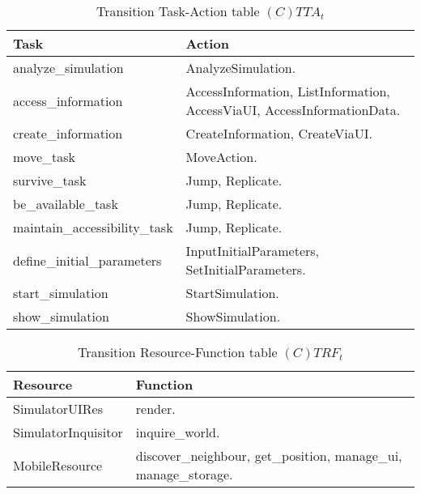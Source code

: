 \begin{table}[H]
	\centering
	\begin{tabular}{|p{4cm}|p{8cm}|}
			\hline
			\textbf{Task} & \textbf{Action} \\
			\hline
			analyze\_simulation & AnalyzeSimulation. \\
			\hline
			access\_information & AccessInformation, ListInformation, AccessViaUI,
			AccessInformationData.\\
			\hline
			create\_information & CreateInformation, CreateViaUI. \\
			\hline
			move\_task & MoveAction. \\
			\hline
			survive\_task & Jump, Replicate. \\
			\hline
			be\_available\_task & Jump, Replicate. \\
			\hline
			maintain\_accessibility\_task & Jump, Replicate. \\
			\hline
			define\_initial\_parameters & InputInitialParameters, SetInitialParameters. \\
			\hline
			start\_simulation & StartSimulation. \\
			\hline
			show\_simulation & ShowSimulation. \\
			\hline
		\end{tabular}
	\caption{Transition Task-Action table $(C)TTA_t$}
	\label{tab:cttat}
\end{table}

\begin{table}[H]
	\centering
	\begin{tabular}{|p{4cm}|p{8cm}|}
			\hline
			\textbf{Resource} & \textbf{Function} \\
			\hline
			SimulatorUIRes & render. \\
			\hline
			SimulatorInquisitor & inquire\_world. \\
			\hline
			MobileResource & discover\_neighbour, get\_position, manage\_ui,
			manage\_storage. \\
			\hline
		\end{tabular}
	\caption{Transition Resource-Function table $(C)TRF_t$}
	\label{tab:ctrft}
\end{table}

